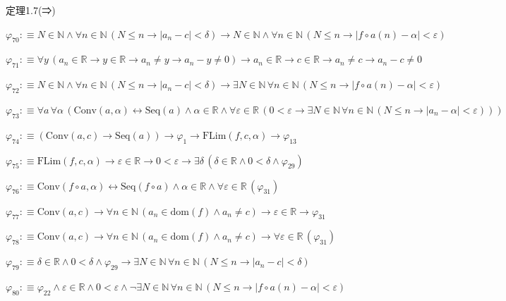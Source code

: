 \begin{fullproof}{定理1.7(⇒)}
\begin{abbrevlist}
\item $\varphi_{70} :\equiv N \in \mathbb{N} \land \forall n \in \mathbb{N}\,(N \leq n \to \lvert a_{n} - c \rvert < \delta) \to N \in \mathbb{N} \land \forall n \in \mathbb{N}\,(N \leq n \to \lvert f \circ a(n) - \alpha \rvert < \varepsilon)$
\item $\varphi_{71} :\equiv \forall y\,(a_{n} \in \mathbb{R} \to y \in \mathbb{R} \to a_{n} \neq y \to a_{n} - y \neq 0) \to a_{n} \in \mathbb{R} \to c \in \mathbb{R} \to a_{n} \neq c \to a_{n} - c \neq 0$
\item $\varphi_{72} :\equiv N \in \mathbb{N} \land \forall n \in \mathbb{N}\,(N \leq n \to \lvert a_{n} - c \rvert < \delta) \to \exists N \in \mathbb{N}\,\forall n \in \mathbb{N}\,(N \leq n \to \lvert f \circ a(n) - \alpha \rvert < \varepsilon)$
\item $\varphi_{73} :\equiv \forall a\,\forall \alpha\,(\mathrm{Conv}(a,\alpha) \leftrightarrow \mathrm{Seq}(a) \land \alpha \in \mathbb{R} \land \forall \varepsilon \in \mathbb{R}\,(0 < \varepsilon \to \exists N \in \mathbb{N}\,\forall n \in \mathbb{N}\,(N \leq n \to \lvert a_{n} - \alpha \rvert < \varepsilon)))$
\item $\varphi_{74} :\equiv (\mathrm{Conv}(a,c) \to \mathrm{Seq}(a)) \to \varphi_{1} \to \mathrm{FLim}(f,c,\alpha) \to \varphi_{13}$
\item $\varphi_{75} :\equiv \mathrm{FLim}(f,c,\alpha) \to \varepsilon \in \mathbb{R} \to 0 < \varepsilon \to \exists \delta\,(\delta \in \mathbb{R} \land 0 < \delta \land \varphi_{29})$
\item $\varphi_{76} :\equiv \mathrm{Conv}(f \circ a,\alpha) \leftrightarrow \mathrm{Seq}(f \circ a) \land \alpha \in \mathbb{R} \land \forall \varepsilon \in \mathbb{R}\,(\varphi_{31})$
\item $\varphi_{77} :\equiv \mathrm{Conv}(a,c) \to \forall n \in \mathbb{N}\,(a_{n} \in \mathrm{dom}(f) \land a_{n} \neq c) \to \varepsilon \in \mathbb{R} \to \varphi_{31}$
\item $\varphi_{78} :\equiv \mathrm{Conv}(a,c) \to \forall n \in \mathbb{N}\,(a_{n} \in \mathrm{dom}(f) \land a_{n} \neq c) \to \forall \varepsilon \in \mathbb{R}\,(\varphi_{31})$
\item $\varphi_{79} :\equiv \delta \in \mathbb{R} \land 0 < \delta \land \varphi_{29} \to \exists N \in \mathbb{N}\,\forall n \in \mathbb{N}\,(N \leq n \to \lvert a_{n} - c \rvert < \delta)$
\item $\varphi_{80} :\equiv \varphi_{22} \land \varepsilon \in \mathbb{R} \land 0 < \varepsilon \land \neg \exists N \in \mathbb{N}\,\forall n \in \mathbb{N}\,(N \leq n \to \lvert f \circ a(n) - \alpha \rvert < \varepsilon)$

\end{abbrevlist}
\end{fullproof}
